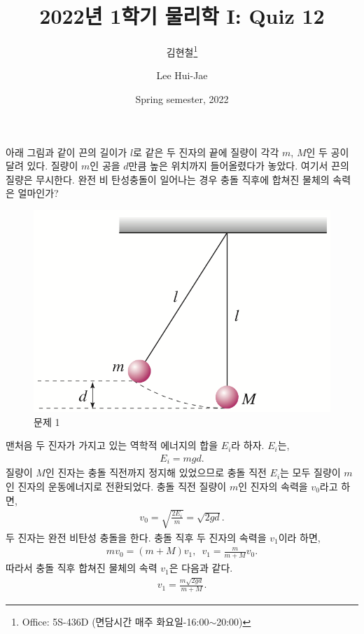 \documentclass[floatfix,nofootinbib,superscriptaddress,fleqn]{revtex4-2}
\begin{document}
\title{\Large 2022년 1학기 물리학 I: Quiz 12}
\author{김현철\footnote{Office: 5S-436D (면담시간 매주
    화요일-16:00$\sim$20:00)}} 
\author{Lee Hui-Jae} 
\date{Spring semester, 2022}

\vspace{1.cm}

\maketitle


아래 그림과 같이 끈의 길이가 $l$로 같은 두 진자의 끝에 질량이 각각
$m$, $M$인 두 공이 달려 있다. 질량이 $m$인 공을 $d$만큼 높은 위치까지 
들어올렸다가 놓았다. 여기서 끈의 질량은 무시한다. 완전 비 탄성충돌이
일어나는 경우 충돌 직후에 합쳐진 물체의 속력은 얼마인가? 
\begin{figure}[ht]
  \centering
\includegraphics[scale=0.5]{Qfig12-1-20210409.png}
  \caption{문제 1}
  \label{fig:1}
\end{figure}


맨처음 두 진자가 가지고 있는 역학적 에너지의 합을 $E_i$라 하자. $E_i$는,
\begin{align}
  E_i = mgd.
\end{align}
질량이 $M$인 진자는 충돌 직전까지 정지해 있었으므로 충돌 직전 $E_i$는 
모두 질량이 $m$인 진자의 운동에너지로 전환되었다. 충돌 직전 질량이 $m$인
진자의 속력을 $v_0$라고 하면,
\begin{align}
  v_0 = \sqrt{\frac{2E_i}{m}} = \sqrt{2gd}.
\end{align}
두 진자는 완전 비탄성 충돌을 한다. 충돌 직후 두 진자의 속력을 $v_1$이라 하면,
\begin{align}
  mv_0 = (m+M)v_1,\,\,\,v_1 = \frac{m}{m+M}v_0.
\end{align}
따라서 충돌 직후 합쳐진 물체의 속력 $v_1$은 다음과 같다.
\begin{align}
  v_1 = \frac{m\sqrt{2gd}}{m+M}.
\end{align}
\vspace{1.cm}
\end{document}
